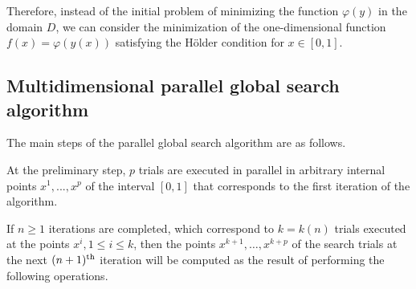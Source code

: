 \documentclass{cmi}
\begin{document}
Therefore, instead of the initial problem of minimizing the function $\varphi(y)$ in the domain $D$,  we can consider the minimization of the one-dimensional function $f(x)=\varphi(y(x))$ satisfying  the H{\"o}lder condition for $ x\in [0,1]$.



\subsection{Multidimensional parallel global search algorithm}\label{SecGSA}

The main steps of the parallel global search algorithm are as follows.

At the preliminary step, $p$ trials are executed in parallel in arbitrary internal points $x^1, ...,x^p$ of  the interval $[0,1]$ that corresponds to the first iteration of the algorithm. 

If $n \geq 1$ iterations are completed, which correspond to $k=k(n)$ trials executed at the points $x^i, 1\leq i\leq  k$, then the points $x^{k+1},\ldots,x^{k+p}$ of the search trials at the next $(n+1)^{\rm  th}$ iteration will be computed as the result of performing the following operations.
\end{document}
